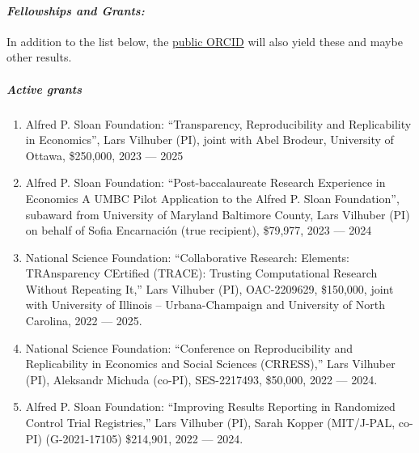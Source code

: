 \documentclass[10pt,letterpaper]{report}
\begin{document}
\paragraph{\it \bf Fellowships and Grants:}
In addition to the list below, the 
\href{http://orcid.org/0000-0001-5733-8932}{public ORCID} will also yield these and maybe other results.
\subparagraph{Active grants}
\begin{enumerate}
  \item Alfred P. Sloan Foundation: ``Transparency, Reproducibility and Replicability in Economics'', Lars Vilhuber (PI), joint with Abel Brodeur, University of Ottawa, \$250,000, 2023 --- 2025
  \item Alfred P. Sloan Foundation: ``Post-baccalaureate Research Experience in Economics A UMBC Pilot Application to the Alfred P. Sloan Foundation'', subaward from University of Maryland Baltimore County, Lars Vilhuber (PI) on behalf of Sofia Encarnación (true recipient), \$79,977, 2023 --- 2024
	\item National Science Foundation: ``Collaborative Research: Elements: TRAnsparency CErtified (TRACE): Trusting Computational Research Without Repeating It,'' Lars Vilhuber (PI),  OAC-2209629, \$150,000, joint with University of Illinois -- Urbana-Champaign and University of North Carolina, 2022 --- 2025.
	\item National Science Foundation: ``Conference on Reproducibility and Replicability in Economics and Social Sciences (CRRESS),'' Lars Vilhuber (PI), Aleksandr Michuda (co-PI), SES-2217493, \$50,000,  2022 --- 2024.
 
	\item Alfred P. Sloan Foundation: ``Improving Results Reporting in Randomized Control Trial Registries,'' Lars Vilhuber (PI), Sarah Kopper (MIT/J-PAL, co-PI) (G-2021-17105) \$214,901, 2022 --- 2024.
\end{enumerate}
\end{document}
